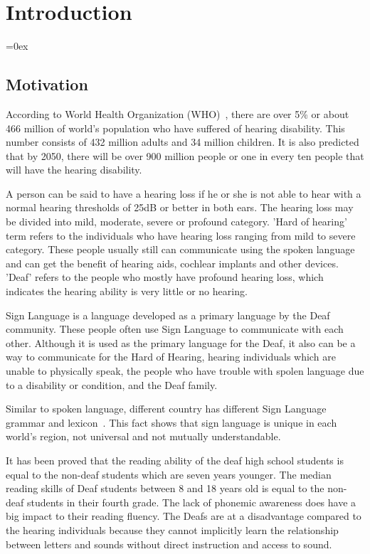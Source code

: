 \chapter{Introduction}
\label{cha:1_introduction} 
\parskip=0ex


\section{Motivation}
\label{sec:2_motivation}
According to World Health Organization (WHO)~\cite{deafnessAndHearingLoss}, there are over 5\% or about 466 million of world's population who have suffered of hearing disability. This number consists of 432 million adults and 34 million children. It is also predicted that by 2050, there will be over 900 million people or one in every ten people that will have the hearing disability.

A person can be said to have a hearing loss if he or she is not able to hear with a normal hearing thresholds of 25dB or better in both ears. The hearing loss may be divided into mild, moderate, severe or profound category. 'Hard of hearing' term refers to the individuals who have hearing loss ranging from mild to severe category. These people usually still can communicate using the spoken language and can get the benefit of hearing aids, cochlear implants and other devices. 'Deaf' refers to the people who mostly have profound hearing loss, which indicates the hearing ability is very little or no hearing. 

Sign Language is a language developed as a primary language by the Deaf community. These people often use Sign Language to communicate with each other. Although it is used as the primary language for the Deaf, it also can be a way to communicate for the Hard of Hearing, hearing individuals which are unable to physically speak, the people who have trouble with spolen language due to a disability or condition, and the Deaf family.

Similar to spoken language, different country has different Sign Language grammar and lexicon~\cite{WendySandler:2006}. This fact shows that sign language is unique in each world's region, not universal and not mutually understandable.

It has been proved that the reading ability of the deaf high school students is equal to the non-deaf students which are seven years younger. The median reading skills of Deaf students between 8 and 18 years old is equal to the non-deaf students in their fourth grade. The lack of phonemic awareness does have a big impact to their reading fluency. The Deafs are at a disadvantage compared to the hearing individuals because they cannot implicitly learn the relationship between letters and sounds without direct instruction and access to sound.

